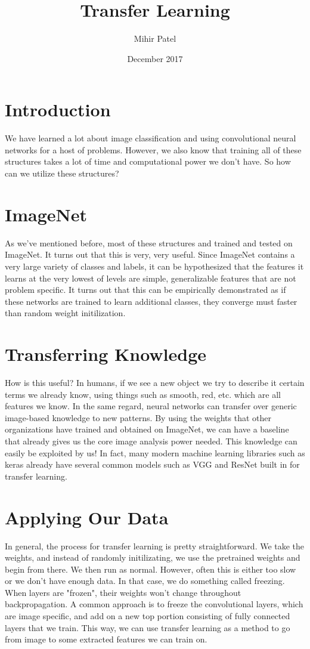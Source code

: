 \documentclass{article}
\title{Transfer Learning}
\author{Mihir Patel}
\date{December 2017}
\begin{document}
\maketitle

\section{Introduction}
We have learned a lot about image classification and using convolutional neural networks for a host of problems. However, we also know that training all of these structures takes a lot of time and computational power we don't have. So how can we utilize these structures?

\section{ImageNet}
As we've mentioned before, most of these structures and trained and tested on ImageNet. It turns out that this is very, very useful. Since ImageNet contains a very large variety of classes and labels, it can be hypothesized that the features it learns at the very lowest of levels are simple, generalizable features that are not problem specific. It turns out that this can be empirically demonstrated as if these networks are trained to learn additional classes, they converge must faster than random weight initilization.

\section{Transferring Knowledge}
How is this useful? In humans, if we see a new object we try to describe it certain terms we already know, using things such as smooth, red, etc. which are all features we know. In the same regard, neural networks can transfer over generic image-based knowledge to new patterns. By using the weights that other organizations have trained and obtained on ImageNet, we can have a baseline that already gives us the core image analysis power needed. This knowledge can easily be exploited by us! In fact, many modern machine learning libraries such as keras already have several common models such as VGG and ResNet built in for transfer learning.

\section{Applying Our Data}
In general, the process for transfer learning is pretty straightforward. We take the weights, and instead of randomly initilizating, we use the pretrained weights and begin from there. We then run as normal. However, often this is either too slow or we don't have enough data. In that case, we do something called freezing. When layers are "frozen", their weights won't change throughout backpropagation. A common approach is to freeze the convolutional layers, which are image specific, and add on a new top portion consisting of fully connected layers that we train. This way, we can use transfer learning as a method to go from image to some extracted features we can train on.
\end{document}
